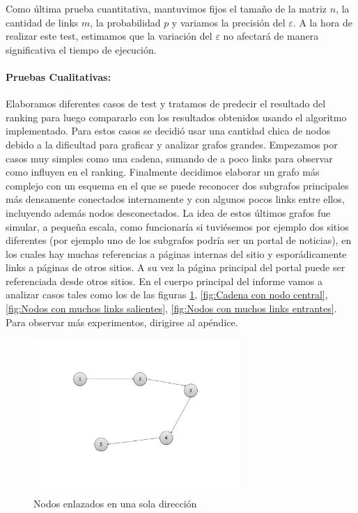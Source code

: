\par
Como \'ultima prueba cuantitativa, mantuvimos fijos el tama\~no de la matriz $n$, la cantidad de links $m$, la probabilidad $p$ y variamos la precisi\'on del $\varepsilon$.
A la hora de realizar este test, estimamos que la variaci\'on del $\varepsilon$ no afectar\'a de manera significativa el tiempo de ejecuci\'on.

\paragraph {Pruebas Cualitativas:}
Elaboramos diferentes casos de test y tratamos de predecir el resultado del ranking para luego compararlo con los resultados obtenidos usando el algoritmo implementado. Para estos casos se decidió usar una cantidad chica de nodos debido a la dificultad para graficar y analizar grafos grandes.
Empezamos por casos muy simples como una cadena, sumando de a poco links para observar como influyen en el ranking.
Finalmente decidimos elaborar un grafo m\'as complejo con un esquema en el que se puede reconocer dos subgrafos principales m\'as densamente conectados internamente y con algunos pocos links entre ellos, incluyendo además nodos desconectados. La idea de estos últimos grafos fue simular, a pequeña escala, como funcionaría si tuviésemos por ejemplo dos sitios diferentes (por ejemplo uno de los subgrafos podría ser un portal de noticias), en los cuales hay muchas referencias a páginas internas del sitio y espor\'adicamente links a páginas de otros sitios. A su vez la página principal del portal puede ser referenciada desde otros sitios. En el cuerpo principal del informe vamos a analizar casos tales como los de las figuras \ref{fig:Cadena simple}, \ref{fig:Cadena con nodo central}, \ref{fig:Nodos con muchos links salientes}, \ref{fig:Nodos con muchos links entrantes}. Para observar m\'as experimentos, dirigirse al ap\'endice.

\begin{figure}[h]
	\centering
	\includegraphics[width=0.7\textwidth]{img/cadena4.png}
	\caption{Nodos enlazados en una sola dirección}
	\label{fig:Cadena simple}
\end{figure}



